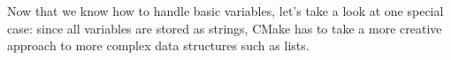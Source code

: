 Now that we know how to handle basic variables, let’s take a look at one special case: since all variables are stored as strings, CMake has to take a more creative approach to more complex data structures such as lists.











































